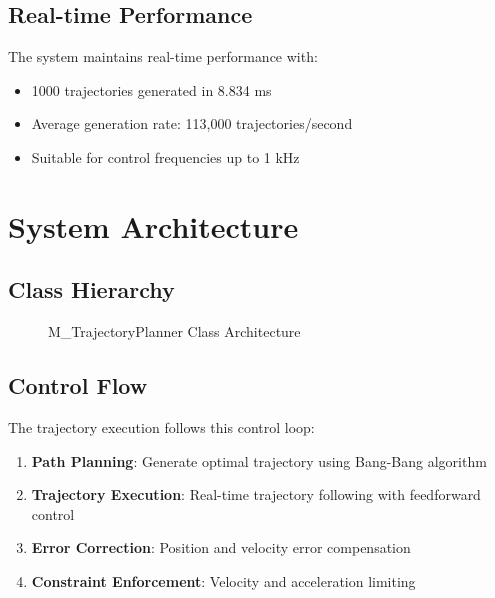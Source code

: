 \documentclass[12pt,a4paper]{article}
\begin{document}
\subsection{Real-time Performance}

The system maintains real-time performance with:
\begin{itemize}
\item 1000 trajectories generated in 8.834 ms
\item Average generation rate: 113,000 trajectories/second
\item Suitable for control frequencies up to 1 kHz
\end{itemize}

\section{System Architecture}

\subsection{Class Hierarchy}

\begin{figure}[h]
\centering
{}
\caption{M\_TrajectoryPlanner Class Architecture}
\end{figure}

\subsection{Control Flow}

The trajectory execution follows this control loop:

\begin{enumerate}
\item \textbf{Path Planning}: Generate optimal trajectory using Bang-Bang algorithm
\item \textbf{Trajectory Execution}: Real-time trajectory following with feedforward control
\item \textbf{Error Correction}: Position and velocity error compensation
\item \textbf{Constraint Enforcement}: Velocity and acceleration limiting
\end{enumerate}
\end{document}
